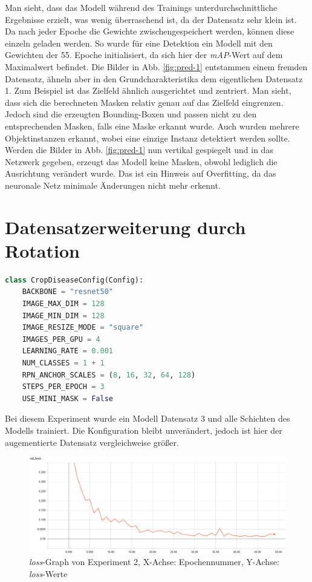\noindent
Man sieht, dass das Modell während des Trainings unterdurchschnittliche Ergebnisse erzielt, was wenig überraschend ist, da der Datensatz sehr klein ist. Da nach jeder Epoche die Gewichte zwischengespeichert werden, können diese einzeln geladen werden. So wurde für eine Detektion ein Modell mit den Gewichten der 55. Epoche initialisiert, da sich hier der \textit{mAP}-Wert auf dem Maximalwert befindet. Die Bilder in Abb. \ref{fig:pred-1} entstammen einem fremden Datensatz, ähneln aber in den Grundcharakteristika dem eigentlichen Datensatz 1. Zum Beispiel ist das Zielfeld ähnlich ausgerichtet und zentriert. Man sieht, dass sich die berechneten Masken relativ genau auf das Zielfeld eingrenzen. Jedoch sind die erzeugten Bounding-Boxen und passen nicht zu den entsprechenden Masken, falls eine Maske erkannt wurde. Auch wurden mehrere Objektinstanzen erkannt, wobei eine einzige Instanz detektiert werden sollte. Werden die Bilder in Abb. \ref{fig:pred-1} nun vertikal gespiegelt und in das Netzwerk gegeben, erzeugt das Modell keine Masken, obwohl lediglich die Ausrichtung verändert wurde. Das ist ein Hinweis auf Overfitting, da das neuronale Netz minimale Änderungen nicht mehr erkennt.

\section{Datensatzerweiterung durch Rotation}\label{sub:sub:sec:experiment-2}

\begin{lstlisting}[language=python,caption={Konfiguration für Experiment 2},captionpos=b]
class CropDiseaseConfig(Config):
    BACKBONE = "resnet50"
    IMAGE_MAX_DIM = 128
    IMAGE_MIN_DIM = 128
    IMAGE_RESIZE_MODE = "square"
    IMAGES_PER_GPU = 4
    LEARNING_RATE = 0.001
    NUM_CLASSES = 1 + 1
    RPN_ANCHOR_SCALES = (8, 16, 32, 64, 128)
    STEPS_PER_EPOCH = 3
    USE_MINI_MASK = False
\end{lstlisting}
\noindent
Bei diesem Experiment wurde ein Modell Datensatz 3 und alle Schichten des Modells trainiert. Die Konfiguration bleibt unverändert, jedoch ist hier der augementierte Datensatz vergleichweise größer.

\begin{figure}[ht]
	\centering
    \includegraphics[width=.7\textwidth]{pics/val-loss-2.PNG}
    \caption{\textit{loss}-Graph von Experiment 2, X-Achse: Epochennummer, Y-Achse: \textit{loss}-Werte}
    \label{fig:val-loss-2}
\end{figure}

